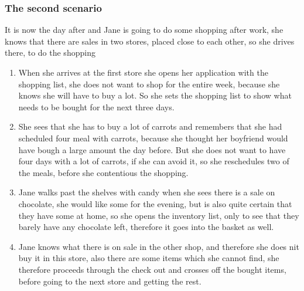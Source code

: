 \subsubsection{The second scenario}
It is now the day after and Jane is going to do some shopping after work, she knows that there are sales in two stores, placed close to each other, so she drives there, to do the shopping
\begin{enumerate}
  \item When she arrives at the first store she opens her application with the shopping list, she does not want to shop for the entire week, because she knows she will have to buy a lot. So she sets the shopping list to show what needs to be bought for the next three days.
  \item She sees that she has to buy a lot of carrots and remembers that she had scheduled four meal with carrots, because she thought her boyfriend would have bough a large amount the day before. But she does not want to have four days with a lot of carrots, if she can avoid it, so she reschedules two of the meals, before she contentious the shopping.
  \item Jane walks past the shelves with candy when she sees there is a sale on chocolate, she would like some for the evening, but is also quite certain that they have some at home, so she opens the inventory list, only to see that they barely have any chocolate left, therefore it goes into the basket as well.
  \item Jane knows what there is on sale in the other shop, and therefore she does nit buy it in this store, also there are some items which she cannot find, she therefore proceeds through the check out and crosses off the bought items, before going to the next store and getting the rest.
\end{enumerate}

